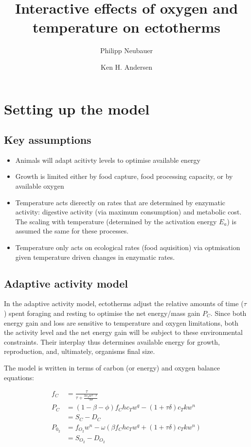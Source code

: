 \documentclass{article}
\title{Interactive effects of oxygen and temperature on ectotherms}
\author{Philipp Neubauer \and Ken H. Andersen}
\begin{document}
\maketitle

\section{Setting up the model}

\subsection{Key assumptions}
\begin{itemize}
\item Animals will adapt acitivty levels to optimise available energy
\item Growth is limited either by food capture, food processing capacity, or by available oxygen
\item Temperature acts dierectly on rates that are determined by enzymatic activity: digestive activity (via maximum consumption) and metabolic cost. The scaling with temperature (determined by the activation energy $E_a$) is assumed the same for these processes.
\item Temperature only acts on ecological rates (food aquisition) via optmisation given temperature driven changes in enzymatic rates.


\end{itemize}

\subsection{Adaptive activity model}

In the adaptive activity model, ectotherms adjust the relative amounts of time ($\tau$) spent foraging and resting to optimise the net energy/mass gain $P_C$. Since both energy gain and loss are sensitive to temperature and oxygen limitations, both the activity level and the net energy gain will be subject to these environmental constraints. Their interplay thus determines available energy for growth, reproduction, and, ultimately, organisms final size.

The model is written in terms of carbon (or energy) and oxygen balance equations:

\begin{align}
f_C &= \frac{\tau }{\tau  + \frac{h c_T w^{q-p}}{\gamma\Theta} } \\
P_C &= (1-\beta-\phi)f_C h c_T w^q  -(1+\tau \delta)c_T k w^n \\
  &= S_C - D_C \\
P_{0_2} &= f_{O_2}w^n - \omega(\beta f_C h c_T w^q +(1+\tau \delta) c_T k w^n) \\
        &= S_{O_2} - D_{O_2}
\end{align}
\end{document}
